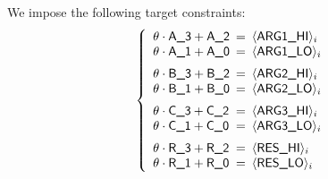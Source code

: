 We impose the following target constraints:
\[
\left\{
\begin{array}{lcl}
	\theta \cdot \col{A\_3} + \col{A\_2} & \!\!\! = \!\!\! & \iArgOneHi_{i} \\
	\theta \cdot \col{A\_1} + \col{A\_0} & \!\!\! = \!\!\! & \iArgOneLo_{i} \vspace{2mm} \\
	\theta \cdot \col{B\_3} + \col{B\_2} & \!\!\! = \!\!\! & \iArgTwoHi_{i} \\
	\theta \cdot \col{B\_1} + \col{B\_0} & \!\!\! = \!\!\! & \iArgTwoLo_{i} \vspace{2mm} \\
	\theta \cdot \col{C\_3} + \col{C\_2} & \!\!\! = \!\!\! & \iArgTreHi_{i} \\
	\theta \cdot \col{C\_1} + \col{C\_0} & \!\!\! = \!\!\! & \iArgTreLo_{i} \vspace{2mm} \\
	\theta \cdot \col{R\_3} + \col{R\_2} & \!\!\! = \!\!\! & \iResHi_{i}    \\
	\theta \cdot \col{R\_1} + \col{R\_0} & \!\!\! = \!\!\! & \iResLo_{i}    \\
\end{array}
\right.
\]